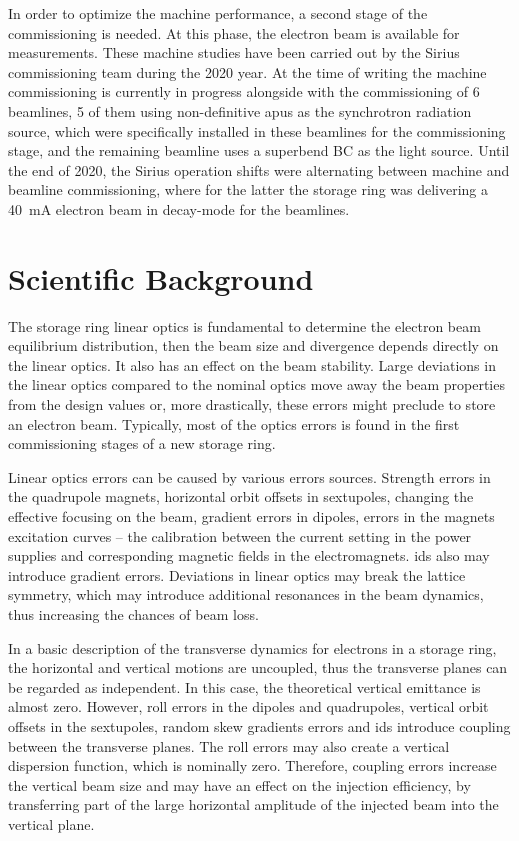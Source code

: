 In order to optimize the machine performance, a second stage of the commissioning is needed. At this phase, the electron beam is available for measurements. These machine studies have been carried out by the Sirius commissioning team during the 2020 year. At the time of writing the machine commissioning is currently in progress alongside with the commissioning of 6 beamlines, 5 of them using non-definitive \glspl{apu} as the synchrotron radiation source, which were specifically installed in these beamlines for the commissioning stage, and the remaining beamline uses a superbend BC as the light source. Until the end of 2020, the Sirius operation shifts were alternating between machine and beamline commissioning, where for the latter the storage ring was delivering a \SI{40}{\milli\ampere} electron beam in decay-mode for the beamlines.
\section{Scientific Background}\label{sec:background}
The storage ring linear optics is fundamental to determine the electron beam equilibrium distribution, then the beam size and divergence depends directly on the linear optics. It also has an effect on the beam stability. Large deviations in the linear optics compared to the nominal optics move away the beam properties from the design values or, more drastically, these errors might preclude to store an electron beam. Typically, most of the optics errors is found in the first commissioning stages of a new storage ring.

Linear optics errors can be caused by various errors sources. Strength errors in the quadrupole magnets, horizontal orbit offsets in sextupoles, changing the effective focusing on the beam, gradient errors in dipoles, errors in the magnets excitation curves -- the calibration between the current setting in the power supplies and corresponding magnetic fields in the electromagnets. \glspl{id} also may introduce gradient errors. Deviations in linear optics may break the lattice symmetry, which may introduce additional resonances in the beam dynamics, thus increasing the chances of beam loss.

In a basic description of the transverse dynamics for electrons in a storage ring, the horizontal and vertical motions are uncoupled, thus the transverse planes can be regarded as independent. In this case, the theoretical vertical emittance is almost zero. However, roll errors in the dipoles and quadrupoles, vertical orbit offsets in the sextupoles, random skew gradients errors and \glspl{id} introduce coupling between the transverse planes. The roll errors may also create a vertical dispersion function, which is nominally zero. Therefore, coupling errors increase the vertical beam size and may have an effect on the injection efficiency, by transferring part of the large horizontal amplitude of the injected beam into the vertical plane.  

